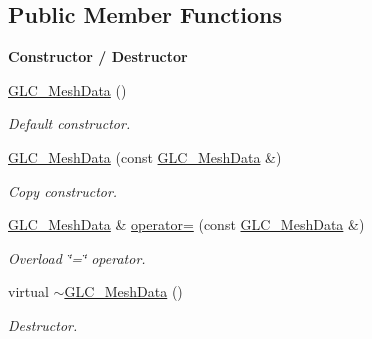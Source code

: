 \subsection*{Public Member Functions}
\begin{Indent}{\bf Constructor / Destructor}\par
\begin{DoxyCompactItemize}
\item 
\hyperlink{class_g_l_c___mesh_data_aea55875b7bbe175482b140fb85381707}{G\-L\-C\-\_\-\-Mesh\-Data} ()
\begin{DoxyCompactList}\small\item\em Default constructor. \end{DoxyCompactList}\item 
\hyperlink{class_g_l_c___mesh_data_a6f03927ba0130579438b03ec1a5b6f0f}{G\-L\-C\-\_\-\-Mesh\-Data} (const \hyperlink{class_g_l_c___mesh_data}{G\-L\-C\-\_\-\-Mesh\-Data} \&)
\begin{DoxyCompactList}\small\item\em Copy constructor. \end{DoxyCompactList}\item 
\hyperlink{class_g_l_c___mesh_data}{G\-L\-C\-\_\-\-Mesh\-Data} \& \hyperlink{class_g_l_c___mesh_data_a4116d8fec515472d6fe700d032c423c7}{operator=} (const \hyperlink{class_g_l_c___mesh_data}{G\-L\-C\-\_\-\-Mesh\-Data} \&)
\begin{DoxyCompactList}\small\item\em Overload \char`\"{}=\char`\"{} operator. \end{DoxyCompactList}\item 
virtual \hyperlink{class_g_l_c___mesh_data_a126debfcff2d10b43c1145f1c0537105}{$\sim$\-G\-L\-C\-\_\-\-Mesh\-Data} ()
\begin{DoxyCompactList}\small\item\em Destructor. \end{DoxyCompactList}\end{DoxyCompactItemize}
\end{Indent}
